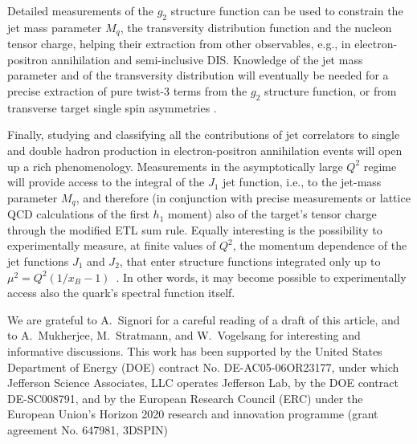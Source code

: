 \documentclass[preprintnumbers,floatfix,nofootinbib]{revtex4}
\def\AAcom#1{{\bf  \textcolor{Red}{[AA: {#1}]}}}
\newcommand{\mj}{M_q}
\begin{document}
Detailed measurements of the $g_2$ structure
function can be used to constrain the jet mass parameter $M_q$, the transversity
distribution function and the nucleon tensor charge, helping their extraction from other observables, e.g., in electron-positron annihilation and semi-inclusive DIS. Knowledge of the jet mass parameter and of the transversity distribution will eventually be needed for a precise extraction of pure twist-3 terms from the $g_2$ structure function, or from transverse target single spin asymmetries \cite{Schlegel:2012ve}.

Finally, studying and classifying all the contributions of jet correlators to single and double hadron production in electron-positron annihilation events will open up a rich phenomenology. Measurements in the asymptotically large $Q^2$ regime will provide access to the integral of the $J_1$ jet function, i.e., to the jet-mass parameter $\mj$, and therefore (in conjunction with precise measurements or lattice QCD calculations of the first $h_1$ moment) also of the target's tensor charge through the modified ETL sum rule. 
Equally interesting is the possibility to experimentally measure, at finite values of $Q^2$, the momentum dependence of the jet functions $J_1$ and $J_2$, that enter structure functions integrated only up to $\mu^2=Q^2(1/x_B-1)$~\cite{Accardi:2008ne}. In other words, it may become possible to experimentally access also the quark's spectral function itself.





\begin{acknowledgments}
We are grateful to A.~Signori for a careful reading of a draft of this article, and to A.~Mukherjee, M.~Stratmann, and W.~Vogelsang for interesting and informative discussions. This work has been supported by the United States Department of Energy (DOE) contract No. DE-AC05-06OR23177,
under which Jefferson Science Associates, LLC operates Jefferson Lab, by the DOE contract DE-SC008791, and 
by the European Research Council (ERC) under the European Union's 
Horizon 2020 research and innovation programme (grant agreement No. 647981,
3DSPIN)
\end{acknowledgments}




\end{document}
